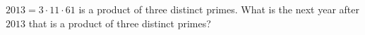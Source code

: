 $2013=3\cdot11\cdot61$ is a product of three distinct primes. What is the next year after $2013$ that is a product of three distinct primes?
